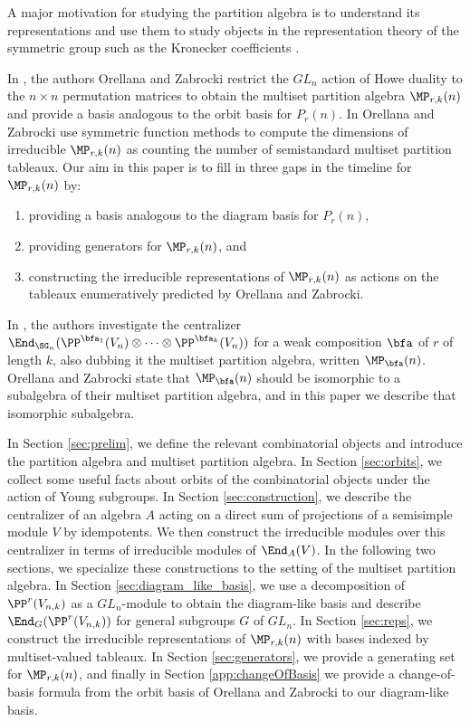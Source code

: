 A major motivation for studying the partition algebra is to understand its representations and use them to study objects in the representation theory of the symmetric group such as the Kronecker coefficients \cite{Benkart2019PartitionAA, Benkart2019PartitionAP, benkart2017dimensions,bowman2021the,enyang2013seminormal,halverson2001characters,halverson2004RSK,Halverson2019SetPartitionTS}. 

In \cite{orellana2020howe}, the authors Orellana and Zabrocki restrict the $GL_n$ action of Howe duality to the $n\times n$ permutation matrices to obtain the multiset partition algebra $\MP_{r,k}(n)$ and provide a basis analogous to the orbit basis for $P_r(n)$. In \cite{orellana2020combinatorial,orellana2020howe} Orellana and Zabrocki use symmetric function methods to compute the dimensions of irreducible $\MP_{r,k}(n)$ as counting the number of semistandard multiset partition tableaux. Our aim in this paper is to fill in three gaps in the timeline for $\MP_{r,k}(n)$ by:
\begin{enumerate}
    \item[(a)] providing a basis analogous to the diagram basis for $P_r(n)$,
    \item[(b)] providing generators for $\MP_{r,k}(n)$, and
    \item[(c)] constructing the irreducible representations of $\MP_{r,k}(n)$ as actions on the tableaux enumeratively predicted by Orellana and Zabrocki.
\end{enumerate}

In \cite{narayanan}, the authors investigate the centralizer $\End_{\SG_n}(\PP^{\bfa_1}(V_n)\otimes\dots\otimes \PP^{\bfa_k}(V_n))$ for a weak composition $\bfa$ of $r$ of length $k$, also dubbing it the multiset partition algebra, written $\MP_\bfa(n)$. Orellana and Zabrocki state that $\MP_\bfa(n)$ should be isomorphic to a subalgebra of their multiset partition algebra, and in this paper we describe that isomorphic subalgebra.

In Section \ref{sec:prelim}, we define the relevant combinatorial objects and introduce the partition algebra and multiset partition algebra. In Section \ref{sec:orbits}, we collect some useful facts about orbits of the combinatorial objects under the action of Young subgroups. In Section \ref{sec:construction}, we describe the centralizer of an algebra $A$ acting on a direct sum of projections of a semisimple module $V$ by idempotents. We then construct the irreducible modules over this centralizer in terms of irreducible modules of $\End_A(V)$. In the following two sections, we specialize these constructions to the setting of the multiset partition algebra. In Section \ref{sec:diagram_like_basis}, we use a decomposition of $\PP^r(V_{n,k})$ as a $GL_n$-module to obtain the diagram-like basis and describe $\End_G(\PP^r(V_{n,k}))$ for general subgroups $G$ of $GL_n$. In Section \ref{sec:reps}, we construct the irreducible representations of $\MP_{r,k}(n)$ with bases indexed by multiset-valued tableaux. In Section \ref{sec:generators}, we provide a generating set for $\MP_{r,k}(n)$, and finally in Section \ref{app:changeOfBasis} we provide a change-of-basis formula from the orbit basis of Orellana and Zabrocki to our diagram-like basis.

